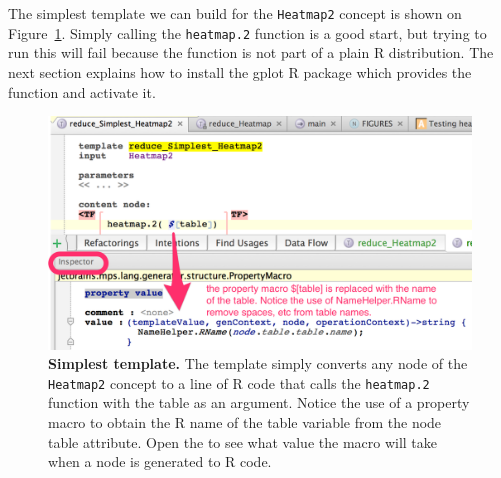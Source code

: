 The simplest template we can build for the \texttt{Heatmap2} concept is shown on Figure~\ref{fig:SimplestTemplate}. Simply calling the \texttt{heatmap.2} function is a good start, but trying to run this will fail because the function is not part of a plain R distribution. The next section explains how to install the gplot R package which provides the function and activate it. 

\begin{figure}[h!tbp]
  \centering
  \includegraphics[width=\figWidthWide]{figures/SimplestTemplate.png}
\caption[Simplest template.]{\textbf{Simplest template.} The template simply converts any node of the \texttt{Heatmap2} concept to a line of R code that calls the \texttt{heatmap.2} function with the table as an argument. Notice the use of a property macro to obtain the R name of the table variable from the node table attribute. Open the \inspectorTabIcon{} to see what value the macro will take when a node is generated to R code.}
\label{fig:SimplestTemplate}
\end{figure}

